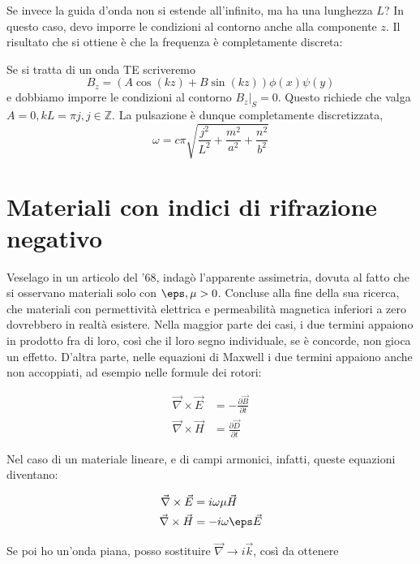 \documentclass{report}
\begin{document}
    Se invece la guida d'onda non si estende all'infinito, ma ha una lunghezza $L$? In questo caso, devo imporre le condizioni al contorno anche alla componente $z$. Il risultato che si ottiene è che la frequenza è completamente discreta: 


    Se si tratta di un onda TE scriveremo
    \begin{equation}
        B_z = (A\cos(kz)+B\sin(kz))\phi(x)\psi(y)
    \end{equation}
    e dobbiamo imporre le condizioni al contorno $B_z|_S = 0$. Questo richiede che valga $A=0, kL = \pi j, j \in \mathbb{Z}$. La pulsazione è dunque completamente discretizzata, 
    \begin{equation}
        \omega = c\pi\sqrt{\frac{ j^2}{L^2} + \frac{m^2}{a^2}+ \frac{n^2}{b^2}}
    \end{equation}


    \section{Materiali con indici di rifrazione negativo}

    Veselago in un articolo del '68, indagò l'apparente assimetria, dovuta al fatto che si osservano materiali solo con \(\eps, \mu >0\). Concluse alla fine della sua ricerca, che materiali con permettività elettrica e permeabilità magnetica inferiori a zero dovrebbero in realtà esistere. Nella maggior parte dei casi, i due termini appaiono in prodotto fra di loro, così che il loro segno individuale, se è concorde, non gioca un effetto. D'altra parte, nelle equazioni di Maxwell i due termini appaiono anche non accoppiati, ad esempio nelle formule dei rotori: 

    \begin{align}
        \vec{\nabla}\times \vec{E} &= -\frac{\partial\vec{B}}{\partial t} \\
        \vec{\nabla} \times \vec{H} &= \frac{\partial \vec{D}}{\partial t}
    \end{align}


    Nel caso di un materiale lineare, e di campi armonici, infatti, queste equazioni diventano: 

    \begin{align}
        \vec{\nabla}\times \vec{E} &=  i\omega \mu \vec{H} \\
        \vec{\nabla} \times \vec{H} &= -i\omega \eps \vec{E}
    \end{align}

    Se poi ho un'onda piana, posso sostituire \(\vec{\nabla} \rightarrow i\vec{k}\), così da ottenere 
\end{document}
